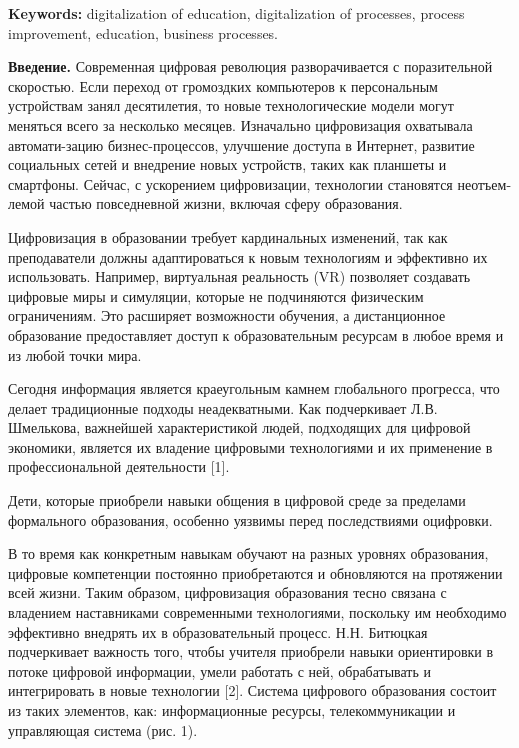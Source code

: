 {\bfseries Keywords:} digitalization of education, digitalization of
processes, process improvement, education, business processes.
\begin{multicols}{2}

{\bfseries Введение.} Современная цифровая революция разворачивается с
поразительной скоростью. Если переход от громоздких компьютеров к
персональным устройствам занял десятилетия, то новые технологические
модели могут меняться всего за несколько месяцев. Изначально
цифровизация охватывала автомати-зацию бизнес-процессов, улучшение
доступа в Интернет, развитие социальных сетей и внедрение новых
устройств, таких как планшеты и смартфоны. Сейчас, с ускорением
цифровизации, технологии становятся неотъем-лемой частью повседневной
жизни, включая сферу образования.

Цифровизация в образовании требует кардинальных изменений, так как
преподаватели должны адаптироваться к новым технологиям и эффективно их
использовать. Например, виртуальная реальность (VR) позволяет создавать
цифровые миры и симуляции, которые не подчиняются физическим
ограничениям. Это расширяет возможности обучения, а дистанционное
образование предоставляет доступ к образовательным ресурсам в любое
время и из любой точки мира.

Сегодня информация является краеугольным камнем глобального прогресса,
что делает традиционные подходы неадекватными. Как подчеркивает Л.В.
Шмелькова, важнейшей характеристикой людей, подходящих для цифровой
экономики, является их владение цифровыми технологиями и их применение в
профессиональной деятельности {[}1{]}.

Дети, которые приобрели навыки общения в цифровой среде за пределами
формального образования, особенно уязвимы перед последствиями оцифровки.

В то время как конкретным навыкам обучают на разных уровнях образования,
цифровые компетенции постоянно приобретаются и обновляются на протяжении
всей жизни. Таким образом, цифровизация образования тесно связана с
владением наставниками современными технологиями, поскольку им
необходимо эффективно внедрять их в образовательный процесс. Н.Н.
Битюцкая подчеркивает важность того, чтобы учителя приобрели навыки
ориентировки в потоке цифровой информации, умели работать с ней,
обрабатывать и интегрировать в новые технологии {[}2{]}. Система
цифрового образования состоит из таких элементов, как: информационные
ресурсы, телекоммуникации и управляющая система (рис. 1).
\end{multicols}

